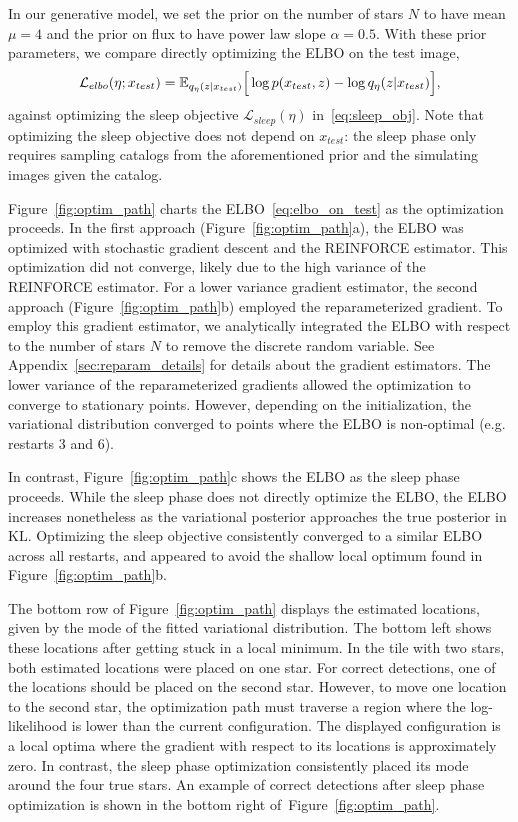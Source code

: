 In our generative model, we set the prior on the number of stars $N$ to have mean $\mu = 4$ and the prior on flux to have power law slope $\alpha = 0.5$. 
With these prior parameters, we compare directly optimizing the ELBO on the test image, 
\begin{align}
\mathcal{L}_{elbo}(\eta; x_{test}) = \mathbb{E}_{q_{\eta}(z | x_{test})}\Big[\log p(x_{test}, z) - \log q_{\eta}(z | x_{test})\Big],
\label{eq:elbo_on_test}
\end{align}
against optimizing the sleep objective $\mathcal{L}_{sleep}(\eta)$ in~\eqref{eq:sleep_obj}. Note that optimizing the sleep objective does not depend on $x_{test}$: the sleep phase only requires sampling catalogs from the aforementioned prior and the simulating images given the catalog. 

Figure~\ref{fig:optim_path} charts the ELBO~\eqref{eq:elbo_on_test} as the optimization proceeds.
In the first approach (Figure~\ref{fig:optim_path}a), the ELBO was optimized with stochastic gradient descent and the REINFORCE estimator.
This optimization did not converge, likely due to the high variance of the REINFORCE estimator. 
For a lower variance gradient estimator, the second approach (Figure~\ref{fig:optim_path}b) employed the reparameterized gradient.  To employ this gradient estimator, we analytically integrated the ELBO with respect to the number of stars $N$ to remove the discrete random variable. 
See Appendix~\ref{sec:reparam_details} for details about the gradient estimators. 
The lower variance of the reparameterized gradients allowed the optimization to converge to stationary points. 
However, depending on the initialization, the variational distribution converged to points where the ELBO is non-optimal (e.g. restarts 3 and 6). 

In contrast, Figure~\ref{fig:optim_path}c shows the ELBO as the sleep phase proceeds. 
While the sleep phase does not directly optimize the ELBO, the ELBO increases nonetheless as the variational posterior approaches the true posterior in $\textrm{KL}$. 
Optimizing the sleep objective consistently converged to a similar ELBO across all restarts, and appeared to avoid the shallow local optimum found in Figure~\ref{fig:optim_path}b.

The bottom row of Figure~\ref{fig:optim_path} displays the estimated locations, given by the mode of the fitted variational distribution. 
The bottom left shows these locations after getting stuck in a local minimum. 
In the tile with two stars, both estimated locations were placed on one star. 
For correct detections, one of the locations should be placed on the second star. 
However, to move one location to the second star, the optimization path must traverse a region where the log-likelihood is lower than the current configuration. 
The displayed configuration is a local optima where the gradient with respect to its locations is approximately zero.
In contrast, the sleep phase optimization consistently placed its mode around the four true stars. 
An example of correct detections after sleep phase optimization is shown in the bottom right of~Figure~\ref{fig:optim_path}.

